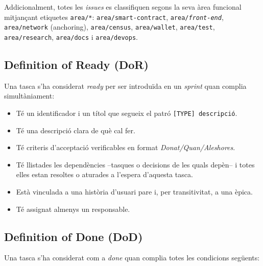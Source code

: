 Addicionalment, totes les \emph{issues} es classifiquen segons la seva àrea funcional mitjançant etiquetes
\texttt{area/*}: \texttt{area/smart-contract}, \texttt{area/\textit{front-end}}, \texttt{area/network} (anchoring),
\texttt{area/census}, \texttt{area/wallet}, \texttt{area/test}, \texttt{area/research}, \texttt{area/docs} i
\texttt{area/devops}.

\subsection{Definition of Ready (\acs{DoR})}
\label{subsec:dor}

Una tasca s'ha considerat \emph{ready} per ser introduïda en un \emph{sprint} quan complia simultàniament:

\begin{itemize}
    \item Té un identificador i un títol que segueix el patró \texttt{[TYPE] descripció}.

    \item Té una descripció clara de què cal fer.

    \item Té criteris d'acceptació verificables en format \emph{Donat/Quan/Aleshores}.

    \item Té llistades les dependències --tasques o decisions de les quals depèn-- i totes elles estan resoltes o
    aturades a l'espera d'aquesta tasca.

    \item Està vinculada a una història d'usuari pare i, per transitivitat, a una èpica.

    \item Té assignat almenys un responsable.
\end{itemize}

\subsection{Definition of Done (\acs{DoD})}
\label{subsec:dod}

Una tasca s'ha considerat com a \emph{done} quan complia totes les condicions següents:

